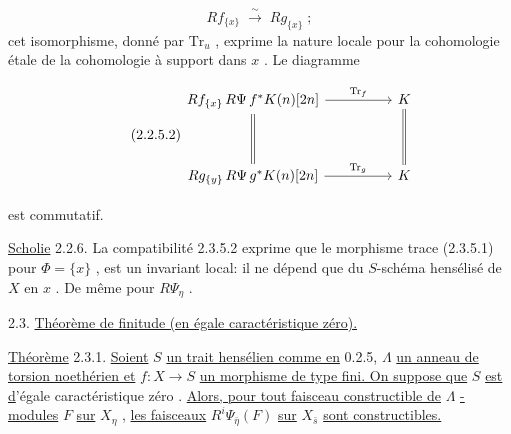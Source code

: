 \begin{equation*}
Rf_{\{x\}} \; \overset{\sim}{\longrightarrow} \; Rg_{\{x\}} \; ;
\end{equation*}
cet isomorphisme, donné par $\mathrm{Tr}_u$ , exprime la nature locale pour la cohomologie étale de la cohomologie à support dans $x$ . Le diagramme 

\begin{equation}\tag{2.2.5.2}
\begin{tikzcd}[column sep=huge, row sep=huge]
Rf_{\{x\}} \, R\Psi\, f^* K(n)[2n] \arrow[r, "\mathrm{Tr}_f"] \arrow[d, equal] & K \arrow[d, equal] \\
Rg_{\{y\}} \, R\Psi\, g^* K(n)[2n] \arrow[r, "\mathrm{Tr}_g"] & K
\end{tikzcd}
\end{equation}


 est commutatif.

\underline{Scholie} 2.2.6.  La compatibilité 2.3.5.2 exprime que le morphisme trace (2.3.5.1) pour $\Phi = \{x\}$ , est un invariant local: il ne dépend que du $S$-schéma hensélisé de $X$ en $x$ . De même pour $R\Psi_{\eta}$ .


2.3.  \underline{Théorème de finitude (en égale caractéristique zéro).}

\underline{Théorème} 2.3.1.  \underline{Soient} $S$ \underline{un trait hensélien comme en} 0.2.5, $\Lambda$ \underline{un anneau de torsion noethérien et} $f : X \to S$ \underline{un morphisme de type fini. On suppose que} $S$ \underline{est} \underline{d}'égale caractéristique zéro . \underline{Alors, pour tout faisceau constructible de} $\Lambda$ \underline{-modules} $F$ \underline{sur} $X_{\eta}$ , \underline{les faisceaux} $R^{i}\Psi_{\bar{\eta}}(F)$ \underline{sur} $X_{\bar{s}}$ \underline{sont constructibles.}

